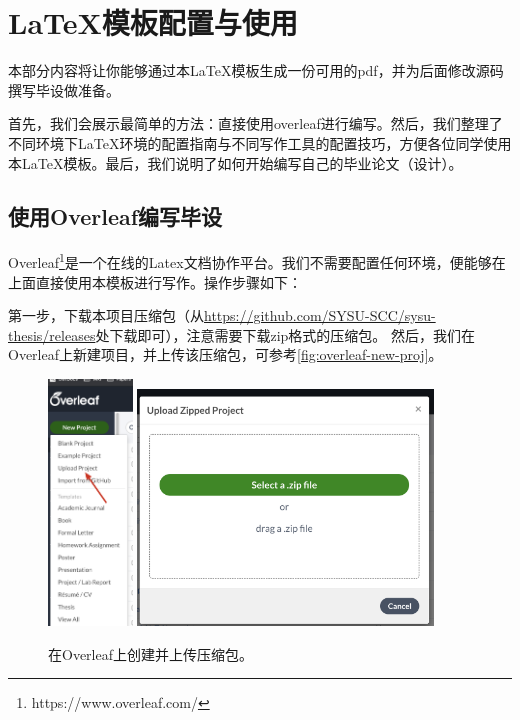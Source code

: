 \chapter{\LaTeX 模板配置与使用}


\label{cha:sysu-thesis-latex-install-guide}

本部分内容将让你能够通过本\LaTeX 模板生成一份可用的pdf，并为后面修改源码撰写毕设做准备。

首先，我们会展示最简单的方法：直接使用overleaf进行编写。然后，我们整理了不同环境下\LaTeX 环境的配置指南与不同写作工具的配置技巧，方便各位同学使用本\LaTeX 模板。最后，我们说明了如何开始编写自己的毕业论文（设计）。


\section{使用Overleaf编写毕设}

Overleaf\footnote{https://www.overleaf.com/}是一个在线的Latex文档协作平台。我们不需要配置任何环境，便能够在上面直接使用本模板进行写作。操作步骤如下：

第一步，下载本项目压缩包（从\url{https://github.com/SYSU-SCC/sysu-thesis/releases}处下载即可），注意需要下载zip格式的压缩包。
然后，我们在Overleaf上新建项目，并上传该压缩包，可参考\autoref{fig:overleaf-new-proj}。


\begin{figure}[h]
	\centering
	\includegraphics[width=0.2\textwidth]{image/chap03/overleaf-create-proj.jpg}
	\includegraphics[width=0.7\textwidth]{image/chap03/overleaf-upload-proj.jpg}
	\caption{在Overleaf上创建并上传压缩包。}
 	\label{fig:overleaf-new-proj}
\end{figure}

